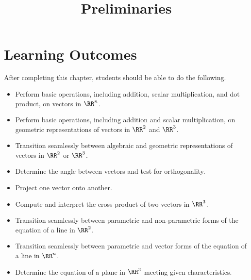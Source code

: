 \documentclass{ximera}
\title{Preliminaries}
\begin{document}
\begin{abstract}
\end{abstract}
 
\maketitle
 
\section*{Learning Outcomes}
After completing this chapter, students should be able to do the following.
 
\begin{itemize}
    \item Perform basic operations, including addition, scalar multiplication, and dot product, on vectors in $\RR^n$.
    
    \item Perform basic operations, including addition and scalar multiplication, on geometric representations of vectors in $\RR^2$ and $\RR^3$.
    
    \item Transition seamlessly between algebraic and geometric representations of vectors in $\RR^2$ or $\RR^3$.
    
   \item  Determine the angle between vectors and test for orthogonality.

   \item  Project one vector onto another.

   \item  Compute and interpret the cross product of two vectors in $\RR^3$. 

   \item Transition seamlessly between parametric and non-parametric forms of the equation of a line in $\RR^2$.
   
   \item Transition seamlessly between parametric and vector forms of the equation of a line in $\RR^n$.

   \item  Determine the equation of a plane in $\RR^3$ meeting given characteristics.
   
 \end{itemize}
 
\end{document}
